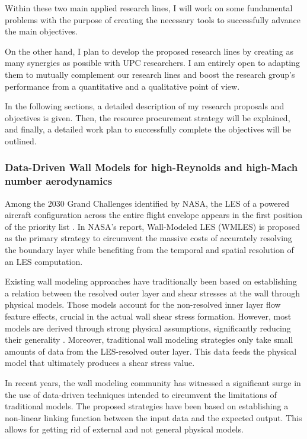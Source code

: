 \documentclass{article}
\begin{document}
Within these two main applied research lines, I will work on some fundamental problems with the purpose of creating the necessary tools to successfully advance the main objectives. 

On the other hand, I plan to develop the proposed research lines by creating as many synergies as possible with UPC researchers. I am entirely open to adapting them to mutually complement our research lines and boost the research group's performance from a quantitative and a qualitative point of view. 

In the following sections, a detailed description of my research proposals and objectives is given. Then, the resource procurement strategy will be explained, and finally, a detailed work plan to successfully complete the objectives will be outlined. 

\subsubsection{Data-Driven Wall Models for high-Reynolds and high-Mach number aerodynamics}

Among the 2030 Grand Challenges identified by NASA, the LES of a powered aircraft configuration across the entire flight envelope appears in the first position of the priority list \cite{SLO14}. In NASA's report, Wall-Modeled LES (WMLES) is proposed as the primary strategy to circumvent the massive costs of accurately resolving the boundary layer while benefiting from the temporal and spatial resolution of an LES computation. 

Existing wall modeling approaches have traditionally been based on establishing a relation between the resolved outer layer and shear stresses at the wall through physical models. Those models account for the non-resolved inner layer flow feature effects, crucial in the actual wall shear stress formation. However, most models are derived through strong physical assumptions, significantly reducing their generality \cite{BOS18}. Moreover, traditional wall modeling strategies only take small amounts of data from the LES-resolved outer layer. This data feeds the physical model that ultimately produces a shear stress value. 

In recent years, the wall modeling community has witnessed a significant surge in the use of data-driven techniques  \cite{VAR23} intended to circumvent the limitations of traditional models. The proposed strategies have been based on establishing a non-linear linking function between the input data and the expected output. This allows for getting rid of external and not general physical models. 
\end{document}
